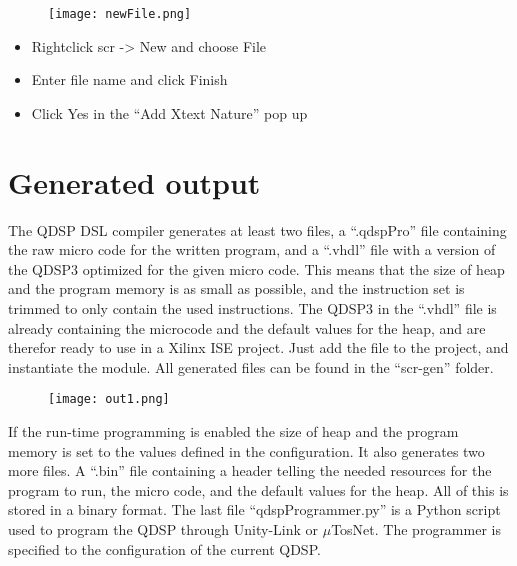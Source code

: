 \begin{figure}[H]
	\centering
		\texttt{[image: newFile.png]}
		\label{fig:newFile}
\end{figure}

\begin{itemize}[leftmargin=3cm]
	\item Rightclick scr -> New and choose File
	\item Enter file name and click Finish
	\item Click Yes in the ``Add Xtext Nature'' pop up
\end{itemize}

\section{Generated output}
The QDSP DSL compiler generates at least two files, a ``.qdspPro'' file containing the raw micro code for the written program, and a ``.vhdl'' file with a version of the QDSP3 optimized for the given micro code. This means that the size of heap  and the program memory is as small as possible, and the instruction set is trimmed to only contain the used instructions. The QDSP3 in the ``.vhdl'' file is already containing the microcode and the default values for the heap, and are therefor ready to use in a Xilinx ISE project. Just add the file to the project, and instantiate the module. All generated files can be found in the ``scr-gen'' folder.
 
\begin{figure}[H]
	\centering
		\texttt{[image: out1.png]}
		\label{fig:out1}
\end{figure}

If the run-time programming is enabled the size of heap  and the program memory is set to the values defined in the configuration. It also generates two more files. A ``.bin'' file containing a header telling the needed resources for the program to run, the micro code, and the default values for the heap. All of this is stored in a binary format. The last file ``qdspProgrammer.py'' is a Python script used to program the QDSP through Unity-Link or $\mu$TosNet. The programmer is specified to the configuration of the current QDSP.